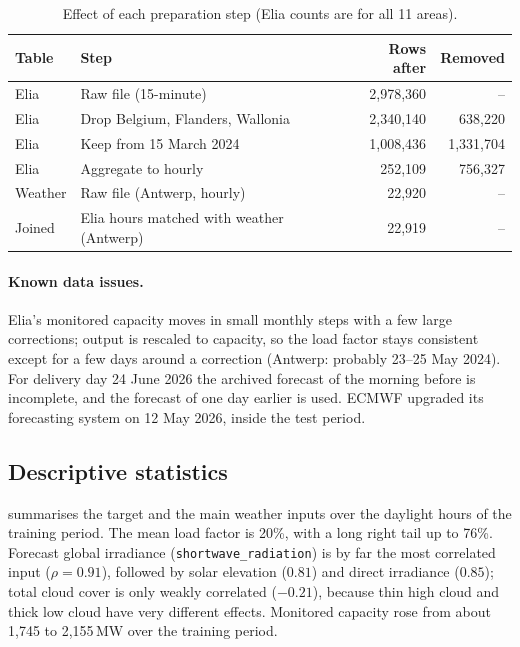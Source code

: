 \documentclass[11pt,a4paper]{article}
\begin{document}
\begin{table}[ht]
\centering\small
\caption{Effect of each preparation step (Elia counts are for all 11 areas).}
\label{tab:prep}
\begin{tabular}{@{}l l r r@{}}
\toprule
Table & Step & Rows after & Removed \\
\midrule
Elia & Raw file (15-minute) & 2,978,360 & -- \\
Elia & Drop Belgium, Flanders, Wallonia & 2,340,140 & 638,220 \\
Elia & Keep from 15 March 2024 & 1,008,436 & 1,331,704 \\
Elia & Aggregate to hourly & 252,109 & 756,327 \\
Weather & Raw file (Antwerp, hourly) & 22,920 & -- \\
Joined & Elia hours matched with weather (Antwerp) & 22,919 & -- \\
\bottomrule
\end{tabular}
\end{table}

\paragraph{Known data issues.}
Elia's monitored capacity moves in small monthly steps with a few large corrections; output is
rescaled to capacity, so the load factor stays consistent except for a few days around a correction
(Antwerp: probably 23--25 May 2024). For delivery day 24 June 2026 the archived forecast of the
morning before is incomplete, and the forecast of one day earlier is used. ECMWF upgraded its
forecasting system on 12 May 2026, inside the test period.

\subsection{Descriptive statistics}

 summarises the target and the main weather inputs over the daylight hours of the
training period. The mean load factor is 20\%, with a long right tail up to 76\%. Forecast
global irradiance (\texttt{shortwave\_radiation}) is by far the most correlated input
($\rho = 0.91$), followed by solar elevation ($0.81$) and direct irradiance ($0.85$); total cloud
cover is only weakly correlated ($-0.21$), because thin high cloud and thick low cloud have very
different effects. Monitored capacity rose from about 1,745 to 2,155\,MW over the training period.
\end{document}
